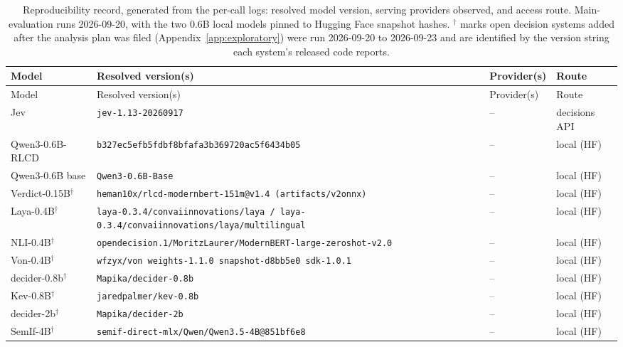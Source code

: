 \begin{longtable}{@{}l >{\raggedright\arraybackslash}p{} >{\raggedright\arraybackslash}p{} l@{}}
\caption{Reproducibility record, generated from the per-call logs: resolved model version, serving providers observed, and access route. Main-evaluation runs 2026-09-20, with the two 0.6B local models pinned to Hugging Face snapshot hashes. $^{\dagger}$ marks open decision systems added after the analysis plan was filed (Appendix~\ref{app:exploratory}) were run 2026-09-20 to 2026-09-23 and are identified by the version string each system's released code reports.}\label{tab:repro}\\
\toprule
Model & Resolved version(s) & Provider(s) & Route \\
\midrule
\endfirsthead
\toprule
Model & Resolved version(s) & Provider(s) & Route \\
\midrule
\endhead
\bottomrule
\endfoot
Jev & \texttt{jev-1.13-20260917} & -- & decisions API \\
Qwen3-0.6B-RLCD & \texttt{b327ec5efb5f\allowbreak dbf8bfafa3b3\allowbreak 69720ac5f643\allowbreak 4b05} & -- & local (HF) \\
Qwen3-0.6B base & \texttt{Qwen3-0.6B-Base} & -- & local (HF) \\
Verdict-0.15B$^{\dagger}$ & \texttt{heman10x/rlc\allowbreak d-modernbert\allowbreak -151m@v1.4 (\allowbreak artifacts/v2\allowbreak  onnx)} & -- & local (HF) \\
Laya-0.4B$^{\dagger}$ & \texttt{laya-0.3.4/c\allowbreak onvaiinnovat\allowbreak ions/laya\,/\,laya-0.3.4/c\allowbreak onvaiinnovat\allowbreak ions/laya/mu\allowbreak ltilingual} & -- & local (HF) \\
NLI-0.4B$^{\dagger}$ & \texttt{opendecision\allowbreak -0.1.1/Morit\allowbreak zLaurer/Mode\allowbreak rnBERT-large\allowbreak -zeroshot-v2\allowbreak .0} & -- & local (HF) \\
Von-0.4B$^{\dagger}$ & \texttt{wfzyx/von we\allowbreak ights-1.1.0 \allowbreak snapshot-d8b\allowbreak b5e0 sdk-1.0\allowbreak .1} & -- & local (HF) \\
decider-0.8b$^{\dagger}$ & \texttt{Mapika/decider-0.8b} & -- & local (HF) \\
Kev-0.8B$^{\dagger}$ & \texttt{jaredpalmer/kev-0.8b} & -- & local (HF) \\
decider-2b$^{\dagger}$ & \texttt{Mapika/decider-2b} & -- & local (HF) \\
SemIf-4B$^{\dagger}$ & \texttt{semif-direct\allowbreak -mlx/Qwen/Qw\allowbreak en3.5-4B@851\allowbreak bf6e8} & -- & local (HF) \\

\end{longtable}
